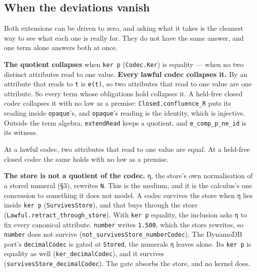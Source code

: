 \subsection{When the deviations vanish}\label{when-the-deviations-vanish}

Both extensions can be driven to zero, and asking what it takes is the cleanest way to see what
each one is really for. They do not have the same answer, and one term alone answers both at
once.

\textbf{The quotient collapses} when \texttt{ker\ p} (\texttt{Codec.Ker}) is equality — when no two distinct attributes
read to one value. \textbf{Every lawful codec collapses it.} By  an attribute that reads to
\texttt{t} is \texttt{e(t)}, so two attributes that read to one value are one attribute. So every term
whose obligations hold collapses it. A held-free closed codec collapses it with no law as a premise: \texttt{Closed.confluence\_R} puts its
reading inside \texttt{opaque}'s, and \texttt{opaque}'s reading is the identity, which is injective. Outside the
term algebra, \texttt{extendRead} keeps a quotient, and \texttt{e\_comp\_p\_ne\_id} is its witness.

\begin{theorem}
\label{thm:ker-heldfree}
\leanok
At a lawful codec, two attributes that read to one value are equal. At a held-free closed codec the
same holds with no law as a premise.
\end{theorem}

\textbf{The store is not a quotient of the codec.} \texttt{η}, the store's own normalisation of a stored
numeral (§3), rewrites \texttt{N}. This is the medium, and it is the calculus's one concession to something it
does not model. A codec survives the store when \texttt{η} lies inside \texttt{ker\ p} (\texttt{SurvivesStore}), and that
buys  through the store (\texttt{Lawful.retract\_through\_store}). With \texttt{ker\ p} equality, the inclusion
asks \texttt{η} to fix every canonical attribute. \texttt{number} writes \texttt{1.500}, which the store rewrites, so \texttt{number} does not
survive (\texttt{not\_survivesStore\_numberCodec}). The DynamoDB port's \texttt{decimalCodec} is gated at \texttt{Stored}, the
numerals \texttt{η} leaves alone. Its \texttt{ker\ p} is equality as well (\texttt{ker\_decimalCodec}), and it survives
(\texttt{survivesStore\_decimalCodec}). The gate absorbs the store, and no kernel does.

